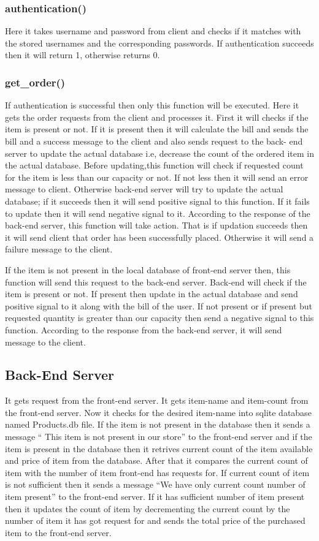\documentclass[11pt]{article}
\begin{document}
			\subsubsection{authentication()}
				Here it takes username and password from client and checks if it matches with the stored usernames and the corresponding passwords. If authentication succeeds then it will return 1, otherwise returns 0.
			\subsubsection{get\_order()}
				If authentication is successful then only this function will be executed. Here it gets the order requests from the client and processes it. First it will checks if the item is present or not. If it is present then it will calculate the bill and sends the bill and a success message to the client and also sends request to the back- end server to update the actual database i.e, decrease the count of the ordered item in the actual database. Before updating,this function will check if requested count for the item is less than our capacity or not. If not less then it will send an error message to client. Otherwise back-end server will try to update the actual database; if it succeeds then it will send positive signal to this function. If it fails to update then it will send negative signal to it. According to the response of the back-end server, this function will take action. That is if updation succeeds then it will send client that order has been successfully placed. Otherwise it will send a failure message to the client.
				
				If the item is not present in the local database of front-end server then, this function will send this request to the back-end server. Back-end will check if the item is present or not. If present then update in the actual database and send positive signal to it
				along with the bill of the user. If not present or if present but requested quantity is greater than our capacity then send a negative signal to this function. According to the response from the back-end server, it will send message to the client.
		\subsection{Back-End Server}
			It gets request from the front-end server. It gets item-name and item-count from the front-end server. Now it checks for the desired item-name into sqlite database named Products.db file. If the item is not present in the
			database then it sends a message “ This item is not present in our store” to the front-end server and if the item is present in the database then it retrives current count of the item available and price of item from the
			database. After that it compares the current count of item with the number of item front-end has requests for. If current count of item is not sufficient then it sends a message “We have only current count number of item present” to the front-end server. If it has sufficient number of item present then it updates the count of item by decrementing the current count by the number of item it has got request for and sends the total price of the purchased item to the front-end server.
\end{document}
